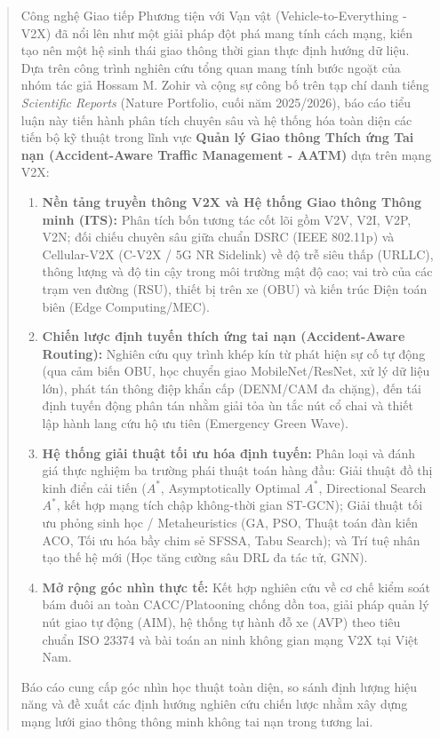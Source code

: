 \documentclass[a4paper]{article}
\begin{document}
\begin{abstract}
Công nghệ Giao tiếp Phương tiện với Vạn vật (Vehicle-to-Everything - V2X) đã nổi lên như một giải pháp đột phá mang tính cách mạng, kiến tạo nên một hệ sinh thái giao thông thời gian thực định hướng dữ liệu. Dựa trên công trình nghiên cứu tổng quan mang tính bước ngoặt của nhóm tác giả Hossam M. Zohir và cộng sự công bố trên tạp chí danh tiếng \textit{Scientific Reports} (Nature Portfolio, cuối năm 2025/2026), báo cáo tiểu luận này tiến hành phân tích chuyên sâu và hệ thống hóa toàn diện các tiến bộ kỹ thuật trong lĩnh vực \textbf{Quản lý Giao thông Thích ứng Tai nạn (Accident-Aware Traffic Management - AATM)} dựa trên mạng V2X:
\begin{enumerate}
    \item \textbf{Nền tảng truyền thông V2X và Hệ thống Giao thông Thông minh (ITS):} Phân tích bốn tương tác cốt lõi gồm V2V, V2I, V2P, V2N; đối chiếu chuyên sâu giữa chuẩn DSRC (IEEE 802.11p) và Cellular-V2X (C-V2X / 5G NR Sidelink) về độ trễ siêu thấp (URLLC), thông lượng và độ tin cậy trong môi trường mật độ cao; vai trò của các trạm ven đường (RSU), thiết bị trên xe (OBU) và kiến trúc Điện toán biên (Edge Computing/MEC).
    \item \textbf{Chiến lược định tuyến thích ứng tai nạn (Accident-Aware Routing):} Nghiên cứu quy trình khép kín từ phát hiện sự cố tự động (qua cảm biến OBU, học chuyển giao MobileNet/ResNet, xử lý dữ liệu lớn), phát tán thông điệp khẩn cấp (DENM/CAM đa chặng), đến tái định tuyến động phân tán nhằm giải tỏa ùn tắc nút cổ chai và thiết lập hành lang cứu hộ ưu tiên (Emergency Green Wave).
    \item \textbf{Hệ thống giải thuật tối ưu hóa định tuyến:} Phân loại và đánh giá thực nghiệm ba trường phái thuật toán hàng đầu: Giải thuật đồ thị kinh điển cải tiến ($A^*$, Asymptotically Optimal $A^*$, Directional Search $A^*$, kết hợp mạng tích chập không-thời gian ST-GCN); Giải thuật tối ưu phỏng sinh học / Metaheuristics (GA, PSO, Thuật toán đàn kiến ACO, Tối ưu hóa bầy chim sẻ SFSSA, Tabu Search); và Trí tuệ nhân tạo thế hệ mới (Học tăng cường sâu DRL đa tác tử, GNN).
    \item \textbf{Mở rộng góc nhìn thực tế:} Kết hợp nghiên cứu về cơ chế kiểm soát bám đuôi an toàn CACC/Platooning chống dồn toa, giải pháp quản lý nút giao tự động (AIM), hệ thống tự hành đỗ xe (AVP) theo tiêu chuẩn ISO 23374 và bài toán an ninh không gian mạng V2X tại Việt Nam.
\end{enumerate}
Báo cáo cung cấp góc nhìn học thuật toàn diện, so sánh định lượng hiệu năng và đề xuất các định hướng nghiên cứu chiến lược nhằm xây dựng mạng lưới giao thông thông minh không tai nạn trong tương lai.
\end{abstract}
\end{document}
